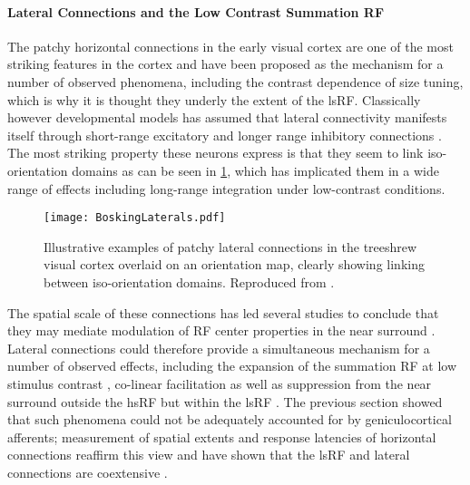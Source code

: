 \paragraph{Lateral Connections and the Low Contrast Summation RF}


The patchy horizontal connections in the early visual cortex are one
of the most striking features in the cortex and have been proposed as
the mechanism for a number of observed phenomena, including the
contrast dependence of size tuning, which is why it is thought they
underly the extent of the lsRF. Classically however developmental
models has assumed that lateral connectivity manifests itself through
short-range excitatory and longer range inhibitory connections
\citep{VonderMalsburg1973,Obermayer1990b}. The most striking property
these neurons express is that they seem to link iso-orientation
domains as can be seen in \ref{BoskingLatExc}, which has implicated
them in a wide range of effects including long-range integration under
low-contrast conditions.

\begin{figure}
	\centering
        \texttt{[image: BoskingLaterals.pdf]}
	\caption[Patchy lateral connections overlaid on an orientation
      map. Reproduced from \cite{Bosking1997}.]{Illustrative
      examples of patchy lateral connections in the treeshrew visual
      cortex overlaid on an orientation map, clearly showing linking
      between iso-orientation domains. Reproduced from
      \cite{Bosking1997}.}
	\label{BoskingLatExc}
\end{figure}

The spatial scale of these connections has led several studies to
conclude that they may mediate modulation of RF center properties in
the near surround \citep{Angelucci2002}. Lateral connections could
therefore provide a simultaneous mechanism for a number of observed
effects, including the expansion of the summation RF at low stimulus
contrast \citep{Sceniak1999}, co-linear facilitation
\citep{Mizobe2001} as well as suppression from the near surround
outside the hsRF but within the lsRF
\citep{Sceniak2001,Levitt2002}. The previous section showed that such
phenomena could not be adequately accounted for by geniculocortical
afferents; measurement of spatial extents and response latencies of
horizontal connections reaffirm this view and have shown that the lsRF
and lateral connections are coextensive \citep{Angelucci2002}.

